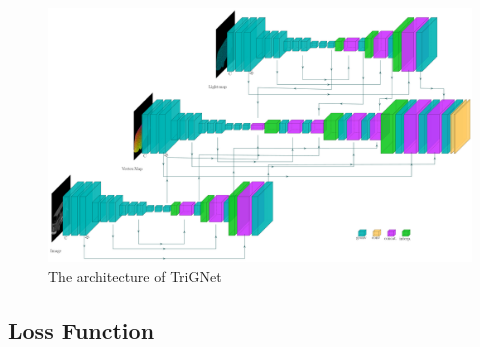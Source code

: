 \documentclass[border=15pt, multi, tikz]{article}
\begin{document}
\begin{figure}
	\centering
	\includegraphics[width=1\textwidth]{Figures/trignet} %
	\caption{The architecture of TriGNet}
	\label{fig:albedo-gated-archi}
\end{figure}


\subsection{Loss Function}
\end{document}
